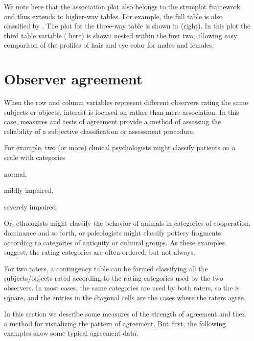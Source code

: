 \documentclass[10pt,krantz2]{krantz}\usepackage[]{graphicx}\usepackage[]{color}
\begin{document}
We note here that the association plot also belongs to the
strucplot framework and thus extends to higher-way tables.
For example, the full  table is
also classified by .
The plot for the three-way table
is shown in  (right).
In this plot the third table
variable ( here) is shown nested within the first two,
allowing easy comparison of the profiles of hair and eye color
for males and females.


\section{Observer agreement}\label{sec:twoway-agree}

When the row and column variables represent different
observers rating the same subjects or objects, interest is focused on
 rather than mere association.
In this case, measures and tests
of agreement provide a method of assessing the
reliability of a subjective classification or assessment procedure.

For example, two (or more) clinical psychologists might classify
patients on a scale with categories
\begin{seriate}
\item normal,
\item mildly impaired,
\item severely impaired.
\end{seriate}
Or, ethologists might classify the behavior
of animals in categories of cooperation, dominance and so forth,
or paleologists might classify pottery fragments according to
categories of antiquity or cultural groups. As these examples
suggest, the rating categories are often ordered, but not always.

For two raters, a
contingency table can be
formed classifying all the subjects/objects rated
according to the rating categories used by the two
observers.
In most cases, the same categories are used by both raters,
so the \ctab is square, and the entries in the diagonal cells
are the cases where the raters agree.

In this section we describe some measures of the strength
of agreement and then a method for visualizing the pattern of
agreement.  But first, the following examples show some
typical agreement data.
\end{document}

